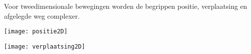\documentclass{ximera}
\begin{document}
Voor tweedimensionale bewegingen worden de begrippen positie, verplaatsing en afgelegde weg complexer.

\begin{image}
\texttt{[image: positie2D]}

\end{image}



\begin{image}
\texttt{[image: verplaatsing2D]}

\end{image}



	
\end{document}
